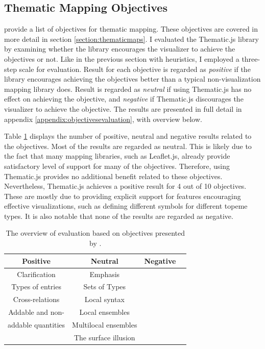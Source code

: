 \subsection{Thematic Mapping Objectives}

\citet{schlichtmann_visualization_2002} provide a list of objectives for thematic mapping. These objectives are covered in more detail in section \ref{section:thematicmaps}. I evaluated the Thematic.js library by examining whether the library encourages the visualizer to achieve the objectives or not. Like in the previous section with heuristics, I employed a three-step scale for evaluation. Result for each objective is regarded as \emph{positive} if the library encourages achieving the objectives better than a typical non-visualization mapping library does. Result is regarded as \emph{neutral} if using Thematic.js has no effect on achieving the objective, and \emph{negative} if Thematic.js discourages the visualizer to achieve the objective. The results are presented in full detail in appendix \ref{appendix:objectivesevaluation}, with overview below.

Table \ref{table:objectivesevaluationoverview} displays the number of positive, neutral and negative results related to the objectives. Most of the results are regarded as neutral. This is likely due to the fact that many mapping libraries, such as Leaflet.js, already provide satisfactory level of support for many of the objectives. Therefore, using Thematic.js provides no additional benefit related to these objectives. Nevertheless, Thematic.js achieves a positive result for 4 out of 10 objectives. These are mostly due to providing explicit support for features encouraging effective visualizations, such as defining different symbols for different topeme types. It is also notable that none of the results are regarded as negative.

\begin{table}[htb]
\centering
\begin{tabular}{|c|c|c|c|}
\hline
\textbf{Positive} & \textbf{Neutral} & \textbf{Negative} \\ 
\hline
Clarification & Emphasis & \\
Types of entries & Sets of Types & \\
Cross-relations & Local syntax & \\
Addable and non- & Local ensembles & \\
addable quantities & Multilocal ensembles & \\
& The surface illusion & \\
\hline
\end{tabular}
\caption{The overview of evaluation based on objectives presented by \citet{schlichtmann_visualization_2002}.}
\label{table:objectivesevaluationoverview}
\end{table}

